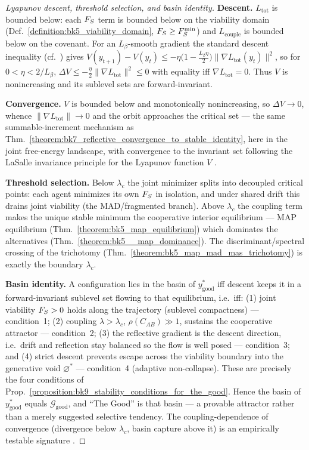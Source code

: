 \begin{proof}[Lyapunov descent, threshold selection, and basin identity]
\label{proof:bk9_good_as_lyapunov_basin}
\leavevmode
\textbf{Descent.} $L_{\mathrm{tot}}$ is bounded below: each $F_S$ term
is bounded below on the viability domain
(Def.~\ref{definition:bk5_viability_domain}, $F_S\ge F_S^{\min}$)
and $L_{\mathrm{couple}}$ is bounded below on the covenant. For an $L_\beta$-smooth
gradient the standard descent inequality (cf.~\citealp{boyd2004convex,nesterov2018lectures}) gives
$V(y_{t+1})-V(y_t)\le -\eta\big(1-\tfrac{L_\beta\eta}{2}\big)\|\nabla L_{\mathrm{tot}}(y_t)\|^2$,
so for $0<\eta<2/L_\beta$, $\Delta V\le -\tfrac{\eta}{2}\|\nabla L_{\mathrm{tot}}\|^2\le 0$
with equality iff $\nabla L_{\mathrm{tot}}=0$. Thus $V$ is nonincreasing and its
sublevel sets are forward-invariant.

\textbf{Convergence.} $V$ is bounded below and monotonically nonincreasing, so
$\Delta V\to 0$, whence $\|\nabla L_{\mathrm{tot}}\|\to 0$ and the orbit approaches
the critical set --- the same summable-increment mechanism as
Thm.~\ref{theorem:bk7_reflective_convergence_to_stable_identity}, here in the
joint free-energy landscape, with convergence to the invariant set following the
LaSalle invariance principle for the Lyapunov function $V$
\citep{lasalle1960,khalil2002nonlinear}.

\textbf{Threshold selection.} Below $\lambda_c$ the joint minimizer splits into
decoupled critical points: each agent minimizes its own $F_S$ in
isolation, and under shared drift this drains joint viability
(the MAD/fragmented branch). Above $\lambda_c$ the coupling term makes the unique
stable minimum the cooperative interior equilibrium --- MAP equilibrium
(Thm.~\ref{theorem:bk5_map_equilibrium}) which dominates the alternatives
(Thm.~\ref{theorem:bk5__map_dominance}). The discriminant/spectral crossing of
the trichotomy (Thm.~\ref{theorem:bk5_map_mad_mas_trichotomy}) is exactly the
boundary $\lambda_c$.

\textbf{Basin identity.} A configuration lies in the basin of
$y^\ast_{\mathrm{good}}$ iff descent keeps it in a forward-invariant sublevel set
flowing to that equilibrium, i.e.\ iff: (1) joint viability $F_S>0$ holds
along the trajectory (sublevel compactness) --- condition~1; (2) coupling
$\lambda>\lambda_c$, $\rho(C_{AB})\gg 1$, sustains the cooperative attractor ---
condition~2; (3) the reflective gradient is the descent direction, i.e.\ drift
and reflection stay balanced so the flow is well posed --- condition~3; and
(4) strict descent prevents escape across the viability boundary into the
generative void $\varnothing^\ast$ --- condition~4 (adaptive non-collapse). These
are precisely the four conditions of
Prop.~\ref{proposition:bk9_stability_conditions_for_the_good}. Hence the basin of
$y^\ast_{\mathrm{good}}$ equals $\mathcal{G}_{\mathrm{good}}$, and ``The Good'' is
that basin --- a provable attractor rather than a merely suggested selective
tendency. The coupling-dependence of convergence (divergence below $\lambda_c$,
basin capture above it) is an empirically testable signature
\citep{tiffany2025wicked}.
\end{proof}

